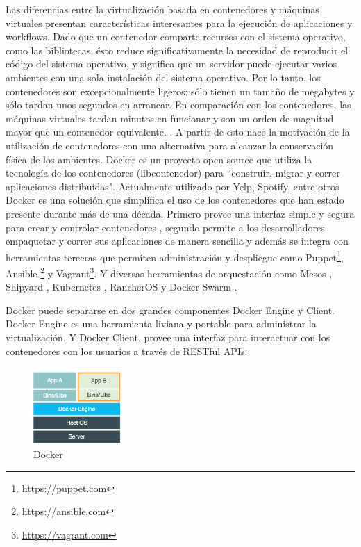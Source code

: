 Las diferencias entre la virtualización basada en contenedores y máquinas virtuales presentan características interesantes para la ejecución de aplicaciones y workflows. Dado que un contenedor comparte recursos con el sistema operativo, como las bibliotecas, ésto reduce significativamente la necesidad de reproducir el código del sistema operativo, y significa que un servidor puede ejecutar varios ambientes con una sola instalación del sistema operativo. 
Por lo tanto, los contenedores son excepcionalmente ligeros: sólo tienen un tamaño de megabytes y sólo tardan unos segundos en arrancar. En comparación con los contenedores, las máquinas virtuales tardan minutos en funcionar y son un orden de magnitud mayor que un contenedor equivalente. \cite{padala2007performance,regola2010recommendations,felter2014updated}. A partir de esto nace la motivación de la utilización de contenedores con una alternativa para alcanzar la conservación física de los ambientes.
Docker es un proyecto open-source que utiliza la tecnología de los contenedores (libcontenedor) para ``construir, migrar y correr aplicaciones distribuidas". Actualmente utilizado por Yelp, Spotify, entre otros \cite{Docker:2015:Online, marmolnetworking}
Docker es una solución que simplifica el uso de los contenedores que han estado presente durante más de una década. Primero provee una interfaz simple y segura para crear y controlar contenedores \cite{bui2015analysis}, segundo permite a los desarrolladores empaquetar y correr sus aplicaciones de manera sencilla y además se integra con herramientas terceras que permiten administración y despliegue como Puppet\footnote{\url{https://puppet.com}}, Ansible \footnote{\url{https://ansible.com}} y Vagrant\footnote{\url{https://vagrant.com}}. Y diversas herramientas de orquestación como Mesos \cite{Apach91:online}, Shipyard \cite{shipy13:online}, Kubernetes \cite{kubernetes:2015:Online}, RancherOS \cite{Ranch38:online} y Docker Swarm	 \cite{Docke38:online}.

Docker puede separarse en dos grandes componentes Docker Engine y Client.
Docker Engine es una herramienta liviana y portable para administrar la virtualización. Y Docker Client, provee una interfaz para interactuar con los contenedores con los usuarios a través de RESTful APIs\cite{bui2015analysis}.\\

\begin{figure}[]
  \centering
    \includegraphics[width=0.3\textwidth]{Figures/docker.png}
    \caption{Docker}
    \label{fig:docker}
\end{figure}

